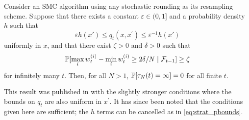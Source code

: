 \begin{prop}\label{thm:SR_nontriviality}
Consider an SMC algorithm using any stochastic rounding as its resampling scheme.
Suppose that there exists a constant $\varepsilon \in (0,1]$ and a probability density $h$ such that
\begin{equation*}
\varepsilon h(x') \leq q_t(x, x^\prime) \leq \varepsilon^{-1} h(x')
\end{equation*}
uniformly in $x$, and that there exist $\zeta >0$ and $\delta >0$ such that 
\begin{equation*}
\mathbb{P}[ \max_i w_t^{(i)} - \min_i w_t^{(i)} \geq 2\delta/N \mid \mathcal{F}_{t-1} ] \geq \zeta
\end{equation*}
 for infinitely many $t$. Then, for all $N>1$, $\mathbb{P}[ \tau_N(t) = \infty ] =0$ for all finite $t$.
\end{prop}
This result was published in \textcite[Lemma B.1]{brown2021} with the slightly stronger conditions where the bounds on $q_t$ are also uniform in $x^\prime$. It has since been noted that the conditions given here are sufficient; the $h$ terms can be  cancelled as in \eqref{eq:strat_pbounds}.

